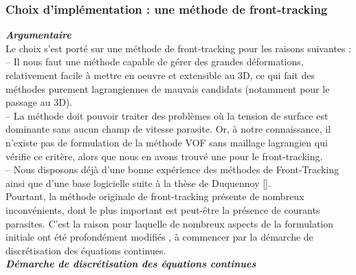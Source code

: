 \subsubsection{Choix d'impl\'ementation : une m\'ethode de front-tracking}

\textit{\textbf{Argumentaire}}\smallskip \\
Le choix s’est port\'e sur une m\'ethode de front-tracking pour les raisons suivantes : \\
– Il nous faut une m\'ethode capable de g\'erer des grandes d\'eformations, relativement facile \`a mettre en oeuvre et extensible au 3D, ce qui fait des m\'ethodes purement lagrangiennes de mauvais candidats (notamment pour le passage au 3D).\\
– La m\'ethode doit pouvoir traiter des probl\`emes o\`u la tension de surface est dominante sans aucun champ de vitesse parasite. Or, à notre connaissance, il n’existe pas de formulation de la m\'ethode VOF sans maillage lagrangien qui v\'erifie ce critère, alors que nous en avons trouv\'e une pour le front-tracking.\\
– Nous disposons d\'ejà d’une bonne exp\'erience des m\'ethodes de Front-Tracking ainsi que d’une base logicielle suite à la th\`ese de Duquennoy [\cite{Duquennoy2000}].\\
Pourtant, la m\'ethode originale de front-tracking pr\'esente de nombreux inconv\'enients, dont le plus important est peut-\^etre la pr\'esence de courants parasites. C’est la raison pour laquelle de nombreux aspects de la formulation initiale ont \'et\'e profond\'ement modifi\'es , \`a commencer par la d\'emarche de discr\'etisation des \'equations continues.\smallskip \\

\textit{\textbf{D\'emarche de discr\'etisation des \'equations continues}}\smallskip \\

